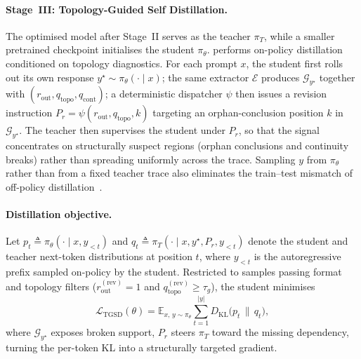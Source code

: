 \paragraph{Stage~III: Topology-Guided Self Distillation.}
\label{sec:tgsd}
The optimised model after Stage~II serves as the teacher $\pi_T$, while a smaller pretrained checkpoint initialises the student $\pi_\theta$. \framework performs on-policy distillation conditioned on topology diagnostics. For each prompt $x$, the student first rolls out its own response $y^{\star}\!\sim\!\pi_\theta(\cdot\!\mid\!x)$; the same extractor $\mathcal{E}$ produces $\mathcal{G}_{y^{\star}}$ together with $(r_{\mathrm{out}},q_{\mathrm{topo}},q_{\mathrm{cont}})$; a deterministic dispatcher $\psi$ then issues a revision instruction $P_r=\psi(r_{\mathrm{out}},q_{\mathrm{topo}},k)$ targeting an orphan-conclusion position $k$ in $\mathcal{G}_{y^{\star}}$. The teacher then supervises the student under $P_r$, so that the signal concentrates on structurally suspect regions (orphan conclusions and continuity breaks) rather than spreading uniformly across the trace. Sampling $y$ from $\pi_\theta$ rather than from a fixed teacher trace also eliminates the train--test mismatch of off-policy distillation~\citep{agarwal2024gkd,song2026opdsurvey}.

\paragraph{Distillation objective.}
Let $p_t \!\triangleq\! \pi_\theta(\cdot\!\mid\!x,y_{<t})$ and $q_t \!\triangleq\! \pi_T(\cdot\!\mid\!x,y^{\star},P_r,y_{<t})$ denote the student and teacher next-token distributions at position $t$, where $y_{<t}$ is the autoregressive prefix sampled on-policy by the student. Restricted to samples passing format and topology filters ($r_{\mathrm{out}}^{(\mathrm{rev})}\!=\!1$ and $q_{\mathrm{topo}}^{(\mathrm{rev})}\!\ge\!\tau_g$), the student minimises
\begin{equation}
\label{eq:tgsd}
\mathcal{L}_{\mathrm{TGSD}}(\theta)=
\mathbb{E}_{x,\,y\sim\pi_\theta}\!\sum_{t=1}^{|y|}
D_{\mathrm{KL}}\!\bigl(p_t\,\|\,q_t\bigr),
\end{equation}
where $\mathcal{G}_{y^{\star}}$ exposes broken support, $P_r$ steers $\pi_T$ toward the missing dependency, turning the per-token KL into a structurally targeted gradient.

